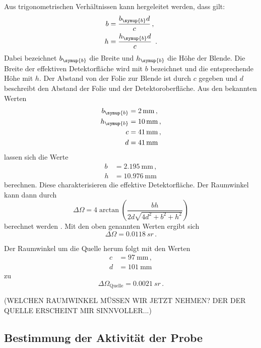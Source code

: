 Aus trigonometrischen Verhältnissen kann hergeleitet werden, dass gilt:
\begin{align*}
  b &= \frac{b_\symup{b} d}{c} \,,\\
  h &= \frac{h_\symup{b} d}{c} \,.
\end{align*}
Dabei bezeichnet $b_\symup{b}$ die Breite und $h_\symup{b}$ die Höhe der Blende.
Die Breite der effektiven Detektorfläche wird mit $b$ bezeichnet und die entsprechende Höhe mit $h$.
Der Abstand von der Folie zur Blende ist durch $c$ gegeben und $d$ beschreibt den Abstand
der Folie und der Detektoroberfläche. Aus den bekannten Werten \cite{Versuchsanleitung}
\begin{align*}
  b_\symup{b} &= \SI{2}{\milli\meter} \,, \\
  h_\symup{b} &= \SI{10}{\milli\meter} \,, \\
  c &= \SI{41}{\milli\meter} \,,\\
  d &= \SI{41}{\milli\meter}
\end{align*}
lassen sich die Werte
\begin{align*}
  b &= \SI{2.195}{\milli\meter} \,,\\
  h &= \SI{10.976}{\milli\meter}
\end{align*}
berechnen. Diese charakterisieren die effektive Detektorfläche. Der Raumwinkel kann dann durch
\begin{equation}
  \Delta \Omega = 4 \arctan\left(\frac{b h}{2d \sqrt{4d^2 + b^2 + h^2}}\right)
\end{equation}
berechnet werden \cite{raumwinkel}. Mit den oben genannten Werten ergibt sich
\begin{equation*}
  \Delta \Omega = \SI{0.0118}{sr} \,.
\end{equation*}

Der Raumwinkel um die Quelle herum folgt mit den Werten \cite{Versuchsanleitung}
\begin{align*}
  c &= \SI{97}{\milli\meter} \,, \\
  d &= \SI{101}{\milli\meter}
\end{align*}
zu
\begin{equation*}
  \Delta \Omega_\text{Quelle} = \SI{0.0021}{sr} \,.
\end{equation*}

(WELCHEN RAUMWINKEL MÜSSEN WIR JETZT NEHMEN? DER DER QUELLE ERSCHEINT MIR SINNVOLLER...)

\subsection{Bestimmung der Aktivität der Probe}
\label{subsec:aktivitaet}

